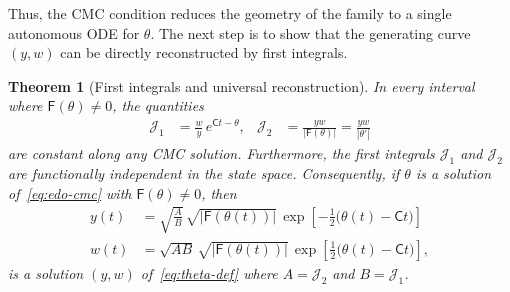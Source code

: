 \documentclass[11pt,a4paper]{amsart}
\theoremstyle{plain}
\newtheorem{theorem}{Theorem}[section]
\theoremstyle{remark}
\newcommand{\C}{\mathsf{C}}
\newcommand{\F}{\mathsf{F}}
\newcommand{\J}{\mathcal{J}}
\begin{document}
Thus, the CMC condition reduces the geometry of the family to a single autonomous ODE
for $\theta$. The next step is to show that
the generating curve $(y,w)$ can be directly reconstructed by first integrals.



\begin{theorem}[First integrals and universal reconstruction]
\label{thm:integrais-reconstrucao}
In every interval where $\F(\theta)\neq0$, the quantities
\begin{align}\label{eq:J1J2}
\J_1&=\frac{w}{y}\,e^{\C t-\theta},&
\J_2&=\frac{yw}{|\F(\theta)|}=\frac{yw}{|\theta'|}
\end{align}
are constant along any CMC solution. Furthermore, the first integrals $\J_1$ and $\J_2$ are functionally independent in the state space.
Consequently, if $\theta$ is a solution 
of~\eqref{eq:edo-cmc} with $\F(\theta)\neq0$, then
\begin{equation}\label{eq:yw-univ}
\boxed{\;
\begin{aligned}
y(t)&=\sqrt{\frac AB}\,\sqrt{|\F(\theta(t))|}\,
\exp\!\left[-\frac12\bigl(\theta(t)-\C t\bigr)\right]\\[2pt]
w(t)&=\sqrt{AB}\,\sqrt{|\F(\theta(t))|}\,
\exp\!\left[\frac12\bigl(\theta(t)-\C t\bigr)\right],
\end{aligned}
\;}
\end{equation}
is a solution $(y,w)$ of~\eqref{eq:theta-def} where
$A=\J_2$ and $B=\J_1$.
\end{theorem}
\end{document}
